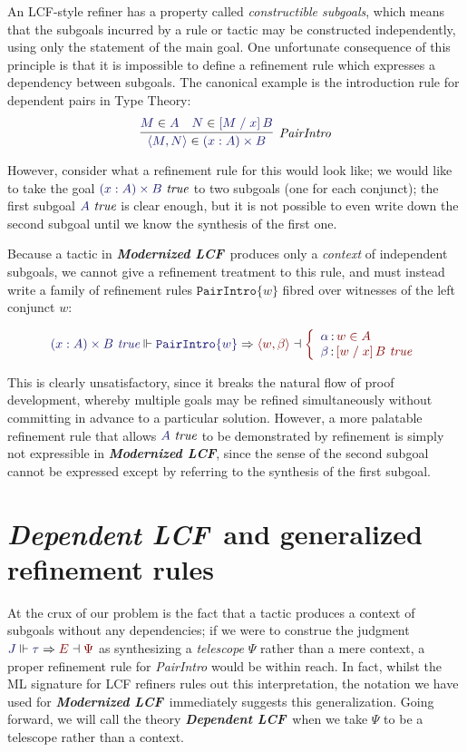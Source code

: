 \documentclass[11pt]{article}
\theoremstyle{definition}
\theoremstyle{remark}
\numberwithin{equation}{section}
\def\InputModeColorName{MidnightBlue}
\def\OutputModeColorName{Maroon}
\newcommand\InputMode[1]{{\color{\InputModeColorName}{#1}}}
\newcommand\OutputMode[1]{{\color{\OutputModeColorName}{#1}}}
\newcommand\JJ{J}
\newcommand\Tuple[1]{\left\langle#1\right\rangle}
\newcommand\OSG[2]{\InputMode{#1}\,{\color{Black}:}\,\OutputMode{#2}}
\newcommand\Refine[4]{\InputMode{#1}\Vdash\InputMode{#2}\Rightarrow\OutputMode{#4}\dashv\OutputMode{#3}}
\newcommand\Member[2]{\InputMode{#1}\in\InputMode{#2}}
\newcommand\MemberUnmoded[2]{#1\in #2}
\newcommand\IsTrue[1]{\InputMode{#1}\ \textit{true}}
\newcommand\IsTrueUnmoded[1]{#1\ \textit{true}}
\newcommand\DProdIntroRule[1]{\mathtt{PairIntro}\{#1\}}
\newcommand\TyDProd[3]{(#2:#1) \times #3}
\newcommand\Subst[3]{\left[#1\;/\;#2\right]#3}
\newcommand\ModLCF{\textbf{\emph{Modernized LCF}}}
\newcommand\DepLCF{\textbf{\emph{Dependent LCF}}}
\begin{document}
An LCF-style refiner has a property called \emph{constructible subgoals}, which
means that the subgoals incurred by a rule or tactic may be constructed
independently, using only the statement of the main goal. One unfortunate
consequence of this principle is that it is impossible to define a refinement
rule which expresses a dependency between subgoals. The canonical example is
the introduction rule for dependent pairs in Type Theory:
\[
  \infer[\textit{PairIntro}]{
    \Member{\Tuple{M,N}}{\TyDProd{A}{x}{B}}
  }{
    \Member{M}{A} &
    \Member{N}{\Subst{M}{x}{B}}
  }
\]

However, consider what a refinement rule for this would look like; we would
like to take the goal $\IsTrue{\TyDProd{A}{x}{B}}$ to two subgoals (one for
each conjunct); the first subgoal $\IsTrue{A}$ is clear enough, but it is not
possible to even write down the second subgoal until we know the synthesis of
the first one.

Because a tactic in \ModLCF\ produces only a \emph{context} of independent
subgoals, we cannot give a refinement treatment to this rule, and must
instead write a family of refinement rules $\DProdIntroRule{w}$ fibred over
witnesses of the left conjunct $w$:

\[
  \Refine{\IsTrueUnmoded{\TyDProd{A}{x}{B}}}{\DProdIntroRule{w}}{%
    \left\{\begin{array}{l}
      \OSG{\alpha}{\MemberUnmoded{w}{A}}\\
      \OSG{\beta}{\IsTrueUnmoded{\Subst{w}{x}{B}}}
    \end{array}\right.
  }{\Tuple{w,\beta}}
\]

This is clearly unsatisfactory, since it breaks the natural flow of proof
development, whereby multiple goals may be refined simultaneously without
committing in advance to a particular solution. However, a more palatable
refinement rule that allows $\IsTrue{A}$ to be demonstrated by refinement is
simply not expressible in \ModLCF, since the sense of the second subgoal cannot
be expressed except by referring to the synthesis of the first subgoal.

\section{\DepLCF\ and generalized refinement rules}

At the crux of our problem is the fact that a tactic produces a context of subgoals
without any dependencies; if we were to construe the judgment
$\Refine{\JJ}{\tau}{\Psi}{E}$ as synthesizing a \emph{telescope} $\Psi$ rather
than a mere context, a proper refinement rule for \emph{PairIntro} would be
within reach. In fact, whilst the ML signature for LCF refiners rules out this
interpretation, the notation we have used for \ModLCF\ immediately suggests
this generalization. Going forward, we will call the theory \DepLCF\ when we
take $\Psi$ to be a telescope rather than a context.
\end{document}
